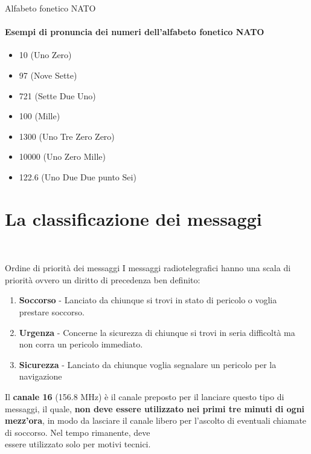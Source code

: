 \documentclass[aspectratio=169]{beamer}
\begin{document}
\begin{frame}{Alfabeto fonetico NATO}
	\framesubtitle{Esempi di pronuncia dei numeri dell'alfabeto fonetico NATO}
		\begin{itemize}
		\item 10 \qquad (Uno Zero)
		\item 97 \qquad (Nove Sette)
		\item 721 \qquad (Sette Due Uno)
		\item 100 \qquad (Mille)
		\item 1300 \qquad (Uno Tre Zero Zero)
		\item 10000 \qquad (Uno Zero Mille)
		\item 122.6 \qquad (Uno Due Due punto Sei)
	\end{itemize}
\end{frame}

\section{La classificazione dei messaggi}
\begin{frame}
	\\
\end{frame}

\begin{frame}{Ordine di priorità dei messaggi}
	I messaggi radiotelegrafici hanno una scala di priorità ovvero un diritto di precedenza ben definito:\\
	\medskip
	\begin{enumerate}
		\item \textbf{Soccorso} - Lanciato da chiunque si trovi in stato di pericolo o voglia prestare soccorso.
		\item \textbf{Urgenza} - Concerne la sicurezza di chiunque si trovi in seria difficoltà ma non corra un pericolo immediato.
		\item \textbf{Sicurezza} - Lanciato da chiunque voglia segnalare un pericolo per la navigazione
	\end{enumerate}
\medskip
Il \textbf{canale 16} (156.8 MHz) è il canale preposto per il lanciare questo tipo di messaggi, il quale, \textbf{non deve essere utilizzato nei primi tre minuti di ogni mezz'ora}, in modo da lasciare il canale libero per l'ascolto di eventuali chiamate di soccorso. Nel tempo rimanente, deve \\essere utilizzato solo per motivi tecnici.
\end{frame}
\end{document}
